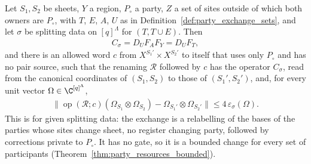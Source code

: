 \begin{theorem}
    \label{thm:party_exchange}
    \leanok
    Let $S_1,S_2$ be sheets, $Y$ a region, $P_\circ$ a party, $Z$ a set of sites outside of
    which both owners are $P_\circ$, with $T$, $E$, $A$, $U$ as in
    Definition~\ref{def:party_exchange_sets}, and let $\sigma$ be splitting data on
    $[q]^\Lambda$ for $(T,T\cup E)$. Then
    \begin{align}
        C_\sigma=D_UF_AF_Y=D_UF_T,
        \label{eq:party_exchange_net}
    \end{align}
    and there is an allowed word $c$ from $X^{S_1'}\times X^{S_2'}$ to itself that uses only
    $P_\circ$ and has no pair source, such that the renaming $\mathcal R$ followed by $c$ has the
    operator $C_\sigma$, read from the canonical coordinates of $(S_1,S_2)$ to those of
    $(S_1',S_2')$, and, for every unit vector $\Omega\in\C^{[q]^\Lambda}$,
    \begin{align}
        \bigl\lVert\operatorname{op}(\mathcal R;c)(\Omega_{S_1}\otimes\Omega_{S_2})
        -\Omega_{S_1'}\otimes\Omega_{S_2'}\bigr\rVert\leq4\,\varepsilon_\sigma(\Omega).
        \label{eq:party_exchange_error}
    \end{align}
    This is \cite[Lemma~6.6]{OpenAI2026PolynomialPEPS} for given splitting data: the exchange is
    a relabelling of the bases of the parties whose sites change sheet, no register changing
    party, followed by corrections private to $P_\circ$. It has no gate, so it is a bounded
    change for every set of participants (Theorem~\ref{thm:party_resources_bounded}).
\end{theorem}
